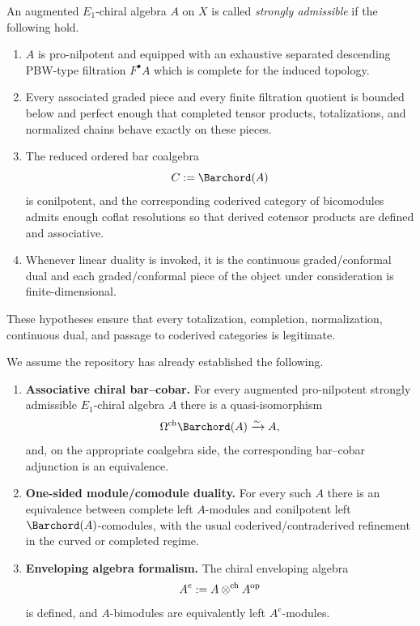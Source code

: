 \begin{definition}
An augmented $E_1$-chiral algebra $A$ on $X$ is called \emph{strongly admissible} if the following
hold.
\begin{enumerate}[label=(\alph*)]
\item $A$ is pro-nilpotent and equipped with an exhaustive separated descending PBW-type filtration
$F^\bullet A$ which is complete for the induced topology.

\item Every associated graded piece and every finite filtration quotient is bounded below and perfect
enough that completed tensor products, totalizations, and normalized chains behave exact\-ly on these
pieces.

\item The reduced ordered bar coalgebra
\[
C:=\Barchord(A)
\]
is conilpotent, and the corresponding coderived category of bicomodules admits enough coflat
resolutions so that derived cotensor products are defined and associative.

\item Whenever linear duality is invoked, it is the continuous graded/conformal dual and each
graded/conformal piece of the object under consideration is finite-dimensional.
\end{enumerate}
\end{definition}

\begin{remark}
These hypotheses ensure that every totalization, completion, normalization, continuous dual, and
passage to coderived categories is legitimate.
\end{remark}

\begin{hypothesis}
\label{hyp:inputs}
We assume the repository has already established the following.
\begin{enumerate}[label=(I)]
\item \textbf{Associative chiral bar--cobar.}
For every augmented pro-nilpotent strongly admissible $E_1$-chiral algebra $A$ there is a
quasi-isomorphism
\[
\Cobar \Barchord(A)\xrightarrow{\sim} A,
\]
and, on the appropriate coalgebra side, the corresponding bar--cobar adjunction is an equivalence.

\item \textbf{One-sided module/comodule duality.}
For every such $A$ there is an equivalence between complete left $A$-modules and conilpotent left
$\Barchord(A)$-comodules, with the usual coderived/contraderived refinement in the curved or completed
regime.

\item \textbf{Enveloping algebra formalism.}
The chiral enveloping algebra
\[
A^e := A\mathbin{\otimes^{\mathrm{ch}}} A^{\mathrm{op}}
\]
is defined, and $A$-bimodules are equivalently left $A^e$-modules.
\end{enumerate}
\end{hypothesis}

